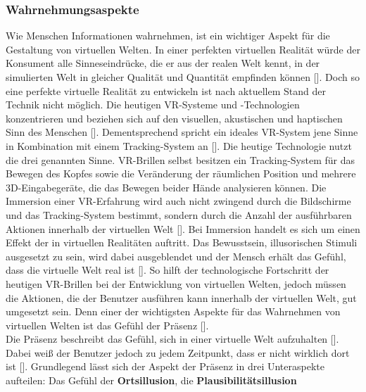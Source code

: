 \documentclass[a4paper,12pt,oneside]{article}
\begin{document}
      \subsubsection{Wahrnehmungsaspekte} \label{Wahrnehmungsaspekte}
        Wie Menschen Informationen wahrnehmen, ist ein wichtiger Aspekt für die Gestaltung
        von virtuellen Welten. In einer perfekten virtuellen Realität würde der Konsument
        alle Sinneseindrücke, die er aus der realen Welt kennt, in der simulierten Welt
        in gleicher Qualität und Quantität empfinden können [\cite[17]{Dorner2013}].
        Doch so eine perfekte virtuelle Realität zu entwickeln ist nach aktuellem Stand
        der Technik nicht möglich. Die heutigen VR-Systeme und -Technologien
        konzentrieren und beziehen sich auf den visuellen, akustischen und haptischen Sinn
        des Menschen [\cite[34]{Dorner2013}]. Dementsprechend spricht ein ideales
        VR-System jene Sinne in Kombination mit einem
        Tracking-System an [\cite{Slater2009}]. Die heutige Technologie nutzt die
        drei genannten Sinne. VR-Brillen selbst besitzen ein Tracking-System für das
        Bewegen des Kopfes sowie die Veränderung der räumlichen Position und mehrere 
        3D-Eingabegeräte,
        die das Bewegen beider Hände analysieren können. Die Immersion einer VR-Erfahrung
        wird auch nicht zwingend durch die Bildschirme und das Tracking-System bestimmt,
        sondern durch die Anzahl der ausführbaren Aktionen innerhalb der virtuellen 
        Welt [\cite{Slater2009}]. Bei Immersion handelt es sich um einen Effekt der
        in virtuellen Realitäten auftritt. Das Bewusstsein, illusorischen Stimuli
        ausgesetzt zu sein, wird dabei ausgeblendet und der Mensch erhält das
        Gefühl, dass die virtuelle Welt real ist [\cite[227]{Witmer1998}].
        So hilft der technologische Fortschritt der heutigen VR-Brillen
        bei der Entwicklung von virtuellen Welten, jedoch müssen die Aktionen, die
        der Benutzer ausführen kann innerhalb der virtuellen Welt, gut umgesetzt sein. 
        Denn einer der wichtigsten Aspekte
        für das Wahrnehmen von virtuellen Welten ist das Gefühl der 
        Präsenz [\cite{Slater2009}]. \\
        Die Präsenz beschreibt das Gefühl, sich in einer virtuelle Welt aufzuhalten [\cite{Slater2009}]. 
        Dabei weiß der Benutzer jedoch zu jedem Zeitpunkt, dass er
        nicht wirklich dort ist [\cite{Slater2009}]. Grundlegend lässt sich der 
        Aspekt der Präsenz in
        drei Unteraspekte aufteilen: Das Gefühl der \textbf{Ortsillusion}, die \textbf{Plausibilitätsillusion}
\end{document}
